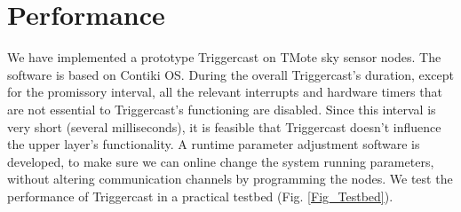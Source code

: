 \documentclass[conference]{IEEEtran}
\begin{document}
\section{Performance}
\label{Sec_experiments}
We have implemented a prototype Triggercast on TMote sky sensor nodes.
The software is based on Contiki OS.
During the overall Triggercast's duration, except for the promissory interval, all the relevant interrupts and hardware timers that are not essential to Triggercast's functioning are disabled.
Since this interval is very short (several milliseconds), it is feasible that Triggercast doesn't influence the upper layer's functionality.
A runtime parameter adjustment software is developed, to make sure we can online change the system running parameters, without altering communication channels by programming the nodes.
We test the performance of Triggercast in a practical testbed (Fig. \ref{Fig_Testbed}).
\end{document}
